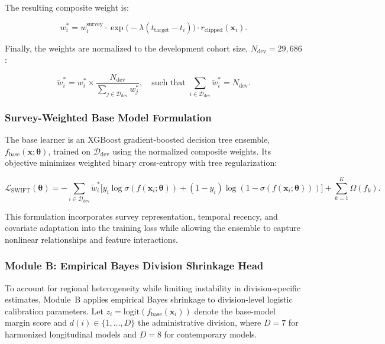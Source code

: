 \documentclass[a4paper,fleqn]{cas-sc}
\begin{document}
The resulting composite weight is:

\begin{equation}
  w_i^* = w_i^{\text{survey}} \cdot \exp\Big( -\lambda (t_{\text{target}} - t_i) \Big) \cdot r_{\text{clipped}}(\mathbf{x}_i).
  \label{eq:composite_weight}
\end{equation}

Finally, the weights are normalized to the development cohort size, $N_{\text{dev}}=29{,}686$:

\begin{equation}
  \tilde{w}_i^* = w_i^* \times \frac{N_{\text{dev}}}{\sum_{j \in \mathcal{D}_{\text{dev}}} w_j^*}, \quad \text{such that } \sum_{i \in \mathcal{D}_{\text{dev}}} \tilde{w}_i^* = N_{\text{dev}}.
  \label{eq:norm_composite_weight}
\end{equation}

\subsubsection{Survey-Weighted Base Model Formulation}
\label{sec:form_base_model}

The base learner is an XGBoost gradient-boosted decision tree ensemble, $f_{\text{base}}(\mathbf{x};\boldsymbol{\theta})$, trained on $\mathcal{D}_{\text{dev}}$ using the normalized composite weights. Its objective minimizes weighted binary cross-entropy with tree regularization:

\begin{equation}
  \mathcal{L}_{\text{SWIFT}}(\boldsymbol{\theta}) = - \sum_{i \in \mathcal{D}_{\text{dev}}} \tilde{w}_i^* \Big[ y_i \log \sigma(f(\mathbf{x}_i; \boldsymbol{\theta})) + (1 - y_i) \log(1 - \sigma(f(\mathbf{x}_i; \boldsymbol{\theta}))) \Big] + \sum_{k=1}^K \Omega(f_k).
  \label{eq:swift_objective}
\end{equation}

This formulation incorporates survey representation, temporal recency, and covariate adaptation into the training loss while allowing the ensemble to capture nonlinear relationships and feature interactions.

\subsubsection{Module B: Empirical Bayes Division Shrinkage Head}
\label{sec:form_module_b}

To account for regional heterogeneity while limiting instability in division-specific estimates, Module~B applies empirical Bayes shrinkage to division-level logistic calibration parameters. Let $z_i=\text{logit}(f_{\text{base}}(\mathbf{x}_i))$ denote the base-model margin score and $d(i)\in\{1,\ldots,D\}$ the administrative division, where $D=7$ for harmonized longitudinal models and $D=8$ for contemporary models.
\end{document}
